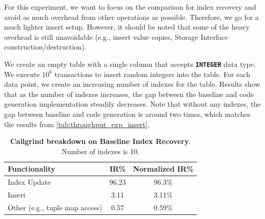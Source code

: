 \documentclass[12pt]{cmuthesis}
\newcommand{\dbSQL}[1]{\texttt{\textbf{#1}}\xspace}
\begin{document}
For this experiment, we want to focus on the comparison for index recovery and avoid as much overhead from other operations as possible. Therefore, we go for a much lighter insert setup. However, it should be noted that some of the heavy overhead is still unavoidable (e.g., insert value copies, Storage Interface construction/destruction).

We create an empty table with a single column that accepts \dbSQL{INTEGER} data type. We execute $10^6$ transactions to insert random integers into the table. For each data point, we create an increasing number of indexes for the table. Results show that as the number of indexes increases, the gap between the baseline and code generation implementation steadily decreases. Note that without any indexes, the gap between baseline and code generation is around two times, which matches the results from \cref{tab:throughput_exp_insert}.

\begin{table}[H]
\begin{center}
\begin{tabular}{ l c c } 
 \toprule
\textbf{Functionality} & \textbf{IR\%} & \textbf{Normalized IR\%}\\ 
 \toprule
Index Update & 96.23 & 96.3\% \\
 \midrule
Insert & 3.11 & 3.11\% \\ 
 \midrule
Other (e.g., tuple map access) & 0.57 & 0.59\% \\
 \bottomrule
\end{tabular}
\caption{\textbf{Callgrind breakdown on Baseline Index Recovery}.  Number of indexes is 10.}
\label{tab:throughput_exp_index_overhead_all}
\end{center}
\end{table}
\end{document}
